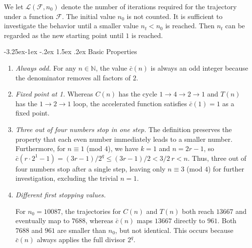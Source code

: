 \documentclass[11pt]{article}
\makeatletter
\renewcommand\subsection{\@startsection{subsection}{2}{\z@}
{-3.25ex\@plus -1ex \@minus -.2ex}
{1.5ex \@plus .2ex}
{\normalfont\normalsize\bfseries\boldmath}}
\theoremstyle{plain}
\theoremstyle{definition}
\theoremstyle{remark}
\makeatother
\begin{document}
We let $\mathcal{L}(\mathcal{F}, n_0)$ denote the number of iterations required for the trajectory under a function $\mathcal{F}$. 
The initial value $n_0$ is not counted.
It is sufficient to investigate the behavior until a smaller value $n_t < n_0$ is reached. Then $n_t$ can be regarded as the new starting point until $1$ is reached.

\subsection{Basic Properties}
\begin{enumerate}
\item \emph{Always odd.} For any $n \in \mathbb{N}$, the value $\bar{c}(n)$ is always an odd integer because the denominator removes all factors of $2$.
\item \emph{Fixed point at 1.} Whereas $C(n)$ has the cycle $1\rightarrow 4\rightarrow 2 \rightarrow 1$ and $T(n)$ has the $1 \to 2 \to 1$ loop, the accelerated function satisfies 
$\bar{c}(1) = 1$ as a fixed point.
\item \emph{Three out of four numbers stop in one step.} The definition preserves the property that each even number immediately leads to a smaller number. Furthermore, for $n \equiv 1$ (mod $4$), we have $k = 1$ and $n = 2r - 1$, so $\bar {c}(r \cdot 2^1 - 1) = (3 r  - 1)/2^q \le (3 r  - 1)/2 < 3/2~r  < n$. 
Thus, three out of four numbers stop after a single step, leaving only $n \equiv 3$ (mod $4$) for further investigation, excluding the trivial $n=1$.
\item \emph{Different first stopping values.}

For $n_0 = 10087$, the trajectories for $C(n)$ and $T(n)$ both reach $13667$ and eventually 
map to $7688$, whereas $\bar{c}(n)$ maps $13667$ directly to $961$. Both $7688$ and $961$ are smaller
 than $n_0$, but not identical. This occurs because $\bar{c}(n)$ always applies the full divisor $2^q$.
 

\end{enumerate}
\end{document}
